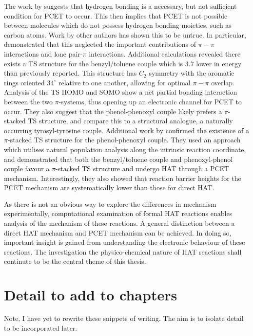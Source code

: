 The work by \citet{Mayer2002} suggests that hydrogen bonding is a necessary, but not sufficient condition for PCET to occur. This then implies that PCET is not possible between molecules which do not possess hydrogen bonding moieties, such as carbon atoms. Work by other authors has shown this to be untrue.\cite{Hatcher2007, DiLabio2007} In particular, \citet{DiLabio2007} demonstrated that this neglected the important contributions of $\pi-\pi$ interactions and lone pair-$\pi$ interactions. Additional calculations revealed there exists a TS structure for the benzyl/toluene couple which is 3.7 \kcalmol lower in energy than previously reported. This structure has $C_2$ symmetry with the aromatic rings oriented $34^\circ$ relative to one another, allowing for optimal $\pi-\pi$ overlap.
Analysis of the TS HOMO and SOMO show a net partial bonding interaction between the two $\pi$-systems, thus opening up an electronic channel for PCET to occur. They also suggest that the phenol-phenoxyl couple likely prefers a $\pi$-stacked TS structure, and compare this to a structural analogue, a naturally occurring tyrosyl-tyrosine couple. Additional work by \citet{MunozRugeles2017} confirmed the existence of a $\pi$-stacked TS structure for the phenol-phenoxyl couple. They used an approach which utilises natural population analysis along the intrinsic reaction coordinate, and demonstrated that both the benzyl/toluene couple and phenoxyl-phenol couple favour a $\pi$-stacked TS structure and undergo HAT through a PCET mechanism. Interestingly, they also showed that reaction barrier heights for the PCET mechanism are systematically lower than those for direct HAT.\@

As there is not an obvious way to explore the differences in mechanism experimentally, computational examination of formal HAT reactions enables analysis of the mechanism of these reactions. A general distinction between a direct HAT mechanism and PCET mechanism can be achieved. In doing so, important insight is gained from understanding the electronic behaviour of these reactions. The investigation the physico-chemical nature of HAT reactions shall continute to be the central theme of this thesis.

\section{Detail to add to chapters}

Note, I have yet to rewrite these snippets of writing. The aim is to isolate detail to be incorporated later.

